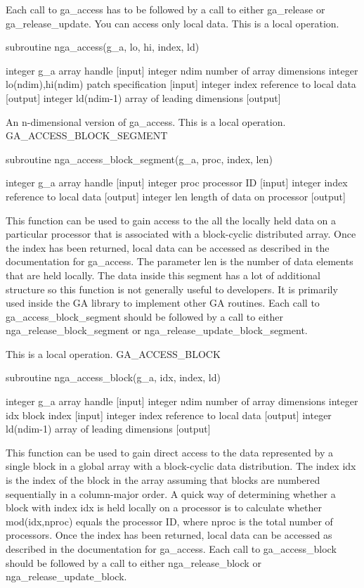 Each call to ga\_access has to be followed by a call to either ga\_release
or ga\_release\_update. You can access only local data. This is a
local operation.

subroutine nga\_access(g\_a, lo, hi, index, ld)

integer g\_a array handle {[}input{]} integer ndim number of array
dimensions integer lo(ndim),hi(ndim) patch specification {[}input{]}
integer index reference to local data {[}output{]} integer ld(ndim-1)
array of leading dimensions {[}output{]}

An n-dimensional version of ga\_access. This is a local operation.
GA\_ACCESS\_BLOCK\_SEGMENT

subroutine nga\_access\_block\_segment(g\_a, proc, index, len)

integer g\_a array handle {[}input{]} integer proc processor ID {[}input{]}
integer index reference to local data {[}output{]} integer len length
of data on processor {[}output{]}

This function can be used to gain access to the all the locally held
data on a particular processor that is associated with a block-cyclic
distributed array. Once the index has been returned, local data can
be accessed as described in the documentation for ga\_access. The
parameter len is the number of data elements that are held locally.
The data inside this segment has a lot of additional structure so
this function is not generally useful to developers. It is primarily
used inside the GA library to implement other GA routines. Each call
to ga\_access\_block\_segment should be followed by a call to either
nga\_release\_block\_segment or nga\_release\_update\_block\_segment.

This is a local operation. GA\_ACCESS\_BLOCK

subroutine nga\_access\_block(g\_a, idx, index, ld)

integer g\_a array handle {[}input{]} integer ndim number of array
dimensions integer idx block index {[}input{]} integer index reference
to local data {[}output{]} integer ld(ndim-1) array of leading dimensions
{[}output{]}

This function can be used to gain direct access to the data represented
by a single block in a global array with a block-cyclic data distribution.
The index idx is the index of the block in the array assuming that
blocks are numbered sequentially in a column-major order. A quick
way of determining whether a block with index idx is held locally
on a processor is to calculate whether mod(idx,nproc) equals the processor
ID, where nproc is the total number of processors. Once the index
has been returned, local data can be accessed as described in the
documentation for ga\_access. Each call to ga\_access\_block should
be followed by a call to either nga\_release\_block or nga\_release\_update\_block.

